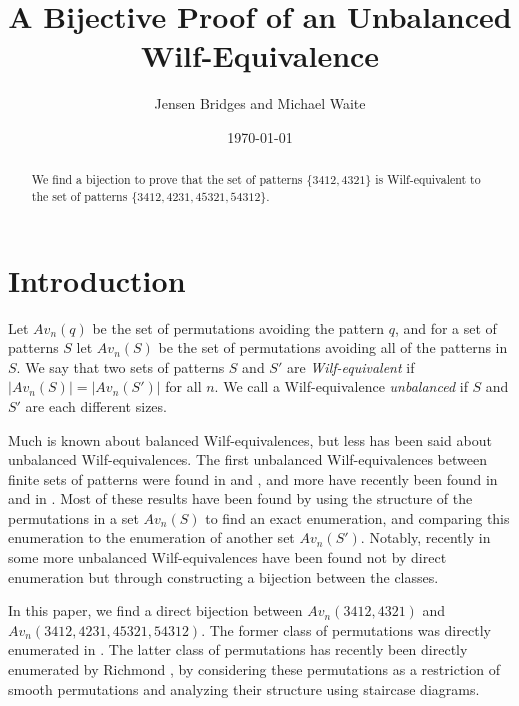 \documentclass[11pt]{amsart}
\date{\today}
\theoremstyle{remark}
\numberwithin{equation}{section}
\begin{document}
\title[A Bijective Proof of an Unbalanced Wilf-Equivalence]{A Bijective Proof of an Unbalanced Wilf-Equivalence}
\author {Jensen Bridges and Michael Waite}
\address{Department of Mathematics, University of Florida, Gainesville, FL 32601}




\begin{abstract} 
We find a bijection to prove that the set of patterns $\{3412, 4321\}$ is Wilf-equivalent to the set of patterns $\{3412,4231,45321,54312\}$.
\end{abstract}

\maketitle

\section{Introduction}

Let $Av_n(q)$ be the set of permutations avoiding the pattern $q$, and for a set of patterns $S$ let $Av_n(S)$ be the set of permutations avoiding all of the patterns in $S$. We say that two sets of patterns $S$ and $S'$ are \textit{Wilf-equivalent} if $|Av_n(S)| = |Av_n(S')|$ for all $n$. We call a Wilf-equivalence \textit{unbalanced} if $S$ and $S'$ are each different sizes.

Much is known about balanced Wilf-equivalences, but less has been said about unbalanced Wilf-equivalences. The first unbalanced Wilf-equivalences between finite sets of patterns were found in \cite{BursteinPantone} and \cite{BloomBurstein}, and more have recently been found in \cite{Defant} and in \cite{BeanNadeauUlfarsson}. Most of these results have been found by using the structure of the permutations in a set $Av_n(S)$ to find an exact enumeration, and comparing this enumeration to the enumeration of another set $Av_n(S')$. Notably, recently in \cite{Nick} some more unbalanced Wilf-equivalences have been found not by direct enumeration but through constructing a bijection between the classes.

In this paper, we find a direct bijection between $Av_n(3412,4321)$ and $Av_n(3412,4231,45321,54312)$. The former class of permutations was directly enumerated in \cite{KremerShiu}.  The latter class of permutations has recently been directly enumerated by Richmond \cite{Richmond}, by considering these permutations as a restriction of smooth permutations and analyzing their structure using staircase diagrams. 
\end{document}
